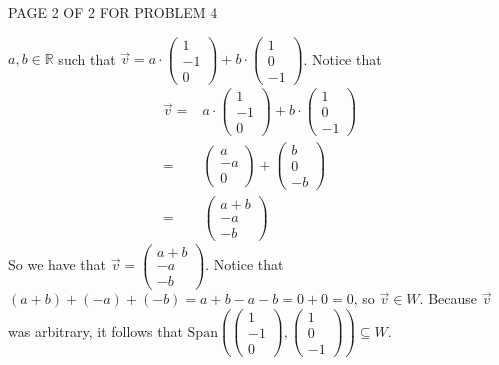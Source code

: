 \documentclass[12pt]{article}
\newenvironment{problem}[2][Problem]
{
	\begin{trivlist} 
		\item[\hskip \labelsep {\bfseries #1 #2:}]
	}
{
	\end{trivlist}
	}
\begin{document}
\begin{problem}{6}
\vfill
\centerline{PAGE 2 OF 2 FOR PROBLEM 4}
%
%
%
\newpage
$a,b \in \mathbb{R}$ such that $\vec{v} =  a\cdot \begin{pmatrix}1\\-1\\0\end{pmatrix} +b\cdot \begin{pmatrix}1\\0\\-1\end{pmatrix}$. Notice that
\begin{align*}
\vec{v} =& a\cdot \begin{pmatrix}1\\-1\\0\end{pmatrix} +b\cdot \begin{pmatrix}1\\0\\-1\end{pmatrix}\\
=& \begin{pmatrix}a\\-a\\0\end{pmatrix} +\begin{pmatrix}b\\0\\-b\end{pmatrix}\\
=& \begin{pmatrix}a+b\\-a\\-b\end{pmatrix}
\end{align*}
So we have that $\vec{v} = \begin{pmatrix}a+b\\-a\\-b\end{pmatrix}$. Notice that $(a+b) + (-a) + (-b) = a+b-a-b =0+0 =0$, so $\vec{v} \in W$. Because $\vec{v}$ was arbitrary, it follows that $\text{Span}\left(\begin{pmatrix}1\\-1\\0\end{pmatrix}, \begin{pmatrix}1\\0\\-1\end{pmatrix}\right) \subseteq W$.


\end{problem}
\end{document}
